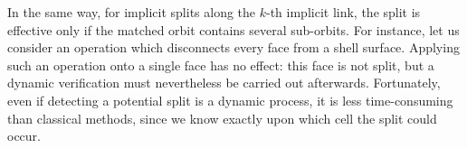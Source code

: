 In the same way, for implicit splits along the $k$-th implicit link, the split is effective only if the matched orbit contains several sub-orbits.
For instance, let us consider an operation which disconnects every face from a shell surface. Applying such an operation onto a single face has no effect: this face is not split, but a dynamic verification must nevertheless be carried out afterwards. Fortunately, even if detecting a potential split is a dynamic process, it is less time-consuming than classical methods, since we know exactly upon which cell the split could occur.


